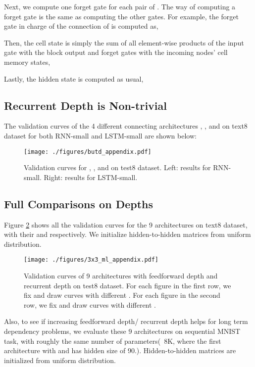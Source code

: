 Next, we compute one forget gate for each pair of . The way of computing a forget gate is the same as computing the other gates. For example, the forget gate in charge of the connection of  is computed as,

Then, the cell state is simply the sum of all element-wise products of the input gate with the block output and forget gates with the incoming nodes' cell memory states,

Lastly, the hidden state is computed as usual,





\subsection{Recurrent Depth is Non-trivial}
\label{sec:exp_dr_nontrivial}
The validation curves of the 4 different connecting
architectures , ,  and  on text8
dataset for both RNN-small and LSTM-small are shown below:
\begin{figure}[htp]
\center
\texttt{[image: ./figures/butd\_appendix.pdf]}
\vspace{-10pt}
\caption{Validation curves for , ,  and  on test8 dataset.
Left: results for RNN-small. Right: results for LSTM-small.}
\label{fig:butd_ex}
\end{figure}

\subsection{Full Comparisons on Depths}
\label{sec:full_com}
Figure \ref{fig:3x3lm_ex}
shows all the validation curves for the 9 architectures on text8 dataset, with
their  and  respectively.
We initialize hidden-to-hidden
matrices from uniform distribution.


\begin{figure}[htp]
\center
\texttt{[image: ./figures/3x3\_ml\_appendix.pdf]}
\vspace{-10pt}
\caption{Validation curves of 9 architectures with feedforward depth 
and recurrent depth  on test8 dataset.
For each figure in the first row, we fix  and draw  curves with different .
For each figure in the second row, we fix  and draw  curves with different .
}
\label{fig:3x3lm_ex}
\end{figure}



Also, to see if increasing feedforward depth/ recurrent depth helps
for long term dependency problems, 
we evaluate these 9 architectures on sequential MNIST task, with roughly the
same number of parameters(~8K, where the first architecture with  and  has hidden size of 90.). 
Hidden-to-hidden matrices
are initialized from uniform distribution.


